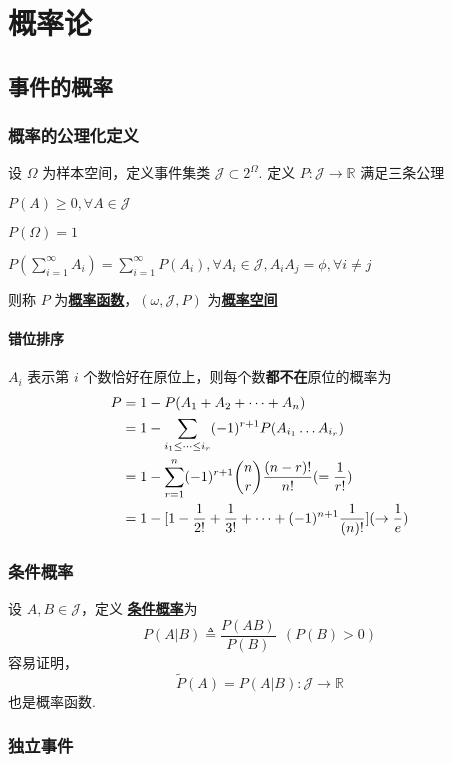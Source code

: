 \documentclass[./main.tex]{subfiles}
\begin{document}
\chapter{概率论}
\section{事件的概率}
\subsection{概率的公理化定义}
\noindent 设 $\Omega$ 为样本空间，定义事件集类 $\mathscr{J}\subset2^\Omega$. 定义 $P:\mathscr{J}\rightarrow\mathbb{R}$ 满足三条公理
\begin{enumerate*}
    \item $P(A)\ge 0,\forall A\in\mathscr{J}$
    \item $P(\Omega)=1$
    \item $P(\sum_{i=1}^{\infty}A_i)=\sum_{i=1}^{\infty}P(A_i),\forall A_i\in\mathscr{J},A_iA_j=\phi,\forall i\neq j$
\end{enumerate*}
则称 $P$ 为\underline{\textbf{概率函数}}，$(\omega,\mathscr{J},P)$ 为\underline{\textbf{概率空间}}
\subsubsection{错位排序}
$A_i$ 表示第 $i$ 个数恰好在原位上，则每个数\textbf{都不在}原位的概率为
\begin{align}
    P&=1-P(A_1+A_2+\dots+A_n)\notag\\
    &=1-\sum_{i_1\le\dots\le i_r}(-1)^{r+1}P(A_{i_1}\dots A_{i_r})\notag\\
    &=1-\sum_{r=1}^n(-1)^{r+1}\binom{n}{r}\frac{(n-r)!}{n!}(=\frac{1}{r!})\notag\\
    &=1-[1-\frac{1}{2!}+\frac{1}{3!}+\dots+(-1)^{n+1}\frac{1}{(n)!}](\rightarrow \frac{1}{e})
\end{align}
\subsection{条件概率}
设 $A,B\in\mathscr{J}$，定义 \underline{\textbf{条件概率}}为
\begin{equation}
    P(A|B)\triangleq\frac{P(AB)}{P(B)}\ \ (P(B)>0)
\end{equation}
容易证明，$$\widetilde{P}(A)=P(A|B):\mathscr{J}\rightarrow\mathbb{R}$$ 也是概率函数. 
\subsection{独立事件}
\end{document}
